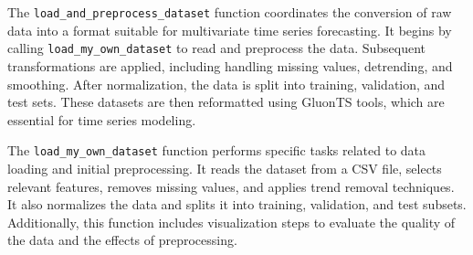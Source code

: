 The \texttt{load\_and\_preprocess\_dataset} function coordinates the conversion of raw data into a format suitable for multivariate time series forecasting. It begins by calling \texttt{load\_my\_own\_dataset} to read and preprocess the data. Subsequent transformations are applied, including handling missing values, detrending, and smoothing. After normalization, the data is split into training, validation, and test sets. These datasets are then reformatted using GluonTS tools, which are essential for time series modeling.

The \texttt{load\_my\_own\_dataset} function performs specific tasks related to data loading and initial preprocessing. It reads the dataset from a CSV file, selects relevant features, removes missing values, and applies trend removal techniques. It also normalizes the data and splits it into training, validation, and test subsets. Additionally, this function includes visualization steps to evaluate the quality of the data and the effects of preprocessing.



